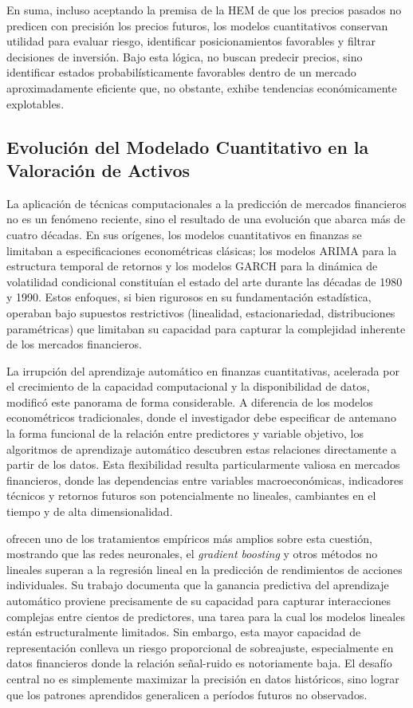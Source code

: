 ﻿\documentclass[11pt,a4paper]{article}
\begin{document}
En suma, incluso aceptando la premisa de la HEM de que los precios pasados no predicen con precisi\'on los precios futuros, los modelos cuantitativos conservan utilidad para evaluar riesgo, identificar posicionamientos favorables y filtrar decisiones de inversi\'on. Bajo esta l\'ogica, no buscan predecir precios, sino identificar estados probabil\'isticamente favorables dentro de un mercado aproximadamente eficiente que, no obstante, exhibe tendencias econ\'omicamente explotables.

\subsection{Evoluci\'on del Modelado Cuantitativo en la Valoraci\'on de Activos}

La aplicaci\'on de t\'ecnicas computacionales a la predicci\'on de mercados financieros no es un fen\'omeno reciente, sino el resultado de una evoluci\'on que abarca m\'as de cuatro d\'ecadas. En sus or\'igenes, los modelos cuantitativos en finanzas se limitaban a especificaciones econom\'etricas cl\'asicas; los modelos ARIMA para la estructura temporal de retornos y los modelos GARCH \citep{bollerslev1986} para la din\'amica de volatilidad condicional constitu\'ian el estado del arte durante las d\'ecadas de 1980 y 1990. Estos enfoques, si bien rigurosos en su fundamentaci\'on estad\'istica, operaban bajo supuestos restrictivos (linealidad, estacionariedad, distribuciones param\'etricas) que limitaban su capacidad para capturar la complejidad inherente de los mercados financieros.

La irrupci\'on del aprendizaje autom\'atico en finanzas cuantitativas, acelerada por el crecimiento de la capacidad computacional y la disponibilidad de datos, modific\'o este panorama de forma considerable. A diferencia de los modelos econom\'etricos tradicionales, donde el investigador debe especificar de antemano la forma funcional de la relaci\'on entre predictores y variable objetivo, los algoritmos de aprendizaje autom\'atico descubren estas relaciones directamente a partir de los datos. Esta flexibilidad resulta particularmente valiosa en mercados financieros, donde las dependencias entre variables macroecon\'omicas, indicadores t\'ecnicos y retornos futuros son potencialmente no lineales, cambiantes en el tiempo y de alta dimensionalidad.

\citet{gu2020} ofrecen uno de los tratamientos emp\'iricos m\'as amplios sobre esta cuesti\'on, mostrando que las redes neuronales, el \textit{gradient boosting} y otros m\'etodos no lineales superan a la regresi\'on lineal en la predicci\'on de rendimientos de acciones individuales. Su trabajo documenta que la ganancia predictiva del aprendizaje autom\'atico proviene precisamente de su capacidad para capturar interacciones complejas entre cientos de predictores, una tarea para la cual los modelos lineales est\'an estructuralmente limitados. Sin embargo, esta mayor capacidad de representaci\'on conlleva un riesgo proporcional de sobreajuste, especialmente en datos financieros donde la relaci\'on se\~nal-ruido es notoriamente baja. El desaf\'io central no es simplemente maximizar la precisi\'on en datos hist\'oricos, sino lograr que los patrones aprendidos generalicen a per\'iodos futuros no observados.
\end{document}
